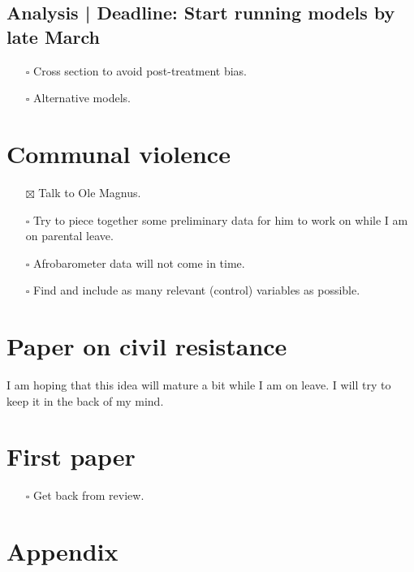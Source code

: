 \documentclass[12pt]{article}
\begin{document}
\subsection{Analysis | Deadline: Start running models by late March}
\begin{itemize}
	\item[$\square$] Cross section to avoid post-treatment bias.
	\item[$\square$] Alternative models.
\end{itemize}

\section{Communal violence}
\begin{itemize}
	\item[$\boxtimes$] Talk to Ole Magnus.

	\item[$\square$] Try to piece together some preliminary data for him to work on while I
	am on parental leave.

	\item[$\square$] Afrobarometer data will not come in time. 

	\item[$\square$] Find and include as many relevant (control) variables as possible.

\end{itemize}

\section{Paper on civil resistance}

I am hoping that this idea will mature a bit while I am on leave. I will try to
keep it in the back of my mind.

\section{First paper}

\begin{itemize}
	\item[$\square$] Get back from review.
\end{itemize}

\pagebreak


{}

\section{Appendix}
\end{document}

